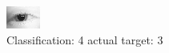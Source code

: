 \begin{figure}[h!]
\begin{center}
\includegraphics[width=0.60\columnwidth]{figures/ID63_class_4_target_3.png}
\end{center}
\caption{ Classification: 4 actual target: 3}
\label{fig:ID63_class_4_target_3}
\end{figure}
